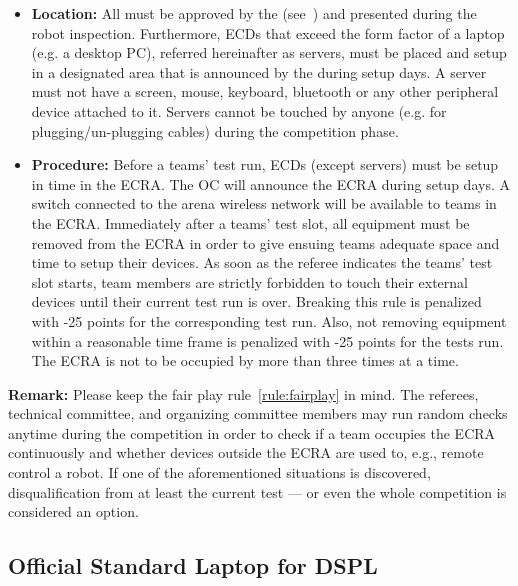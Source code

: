 \begin{itemize}
  \item \textbf{Location:} All  must be approved by the 
  		(see~) and presented during the robot inspection. Furthermore, ECDs
  		that exceed the form factor of a laptop (e.g. a desktop PC), referred hereinafter as servers, must be placed and
  		setup in a designated area that is announced by the  during setup days.
  		A server must not have a screen, mouse, keyboard, bluetooth or any other peripheral device attached to it.
  		Servers cannot be touched by anyone (e.g. for plugging/un-plugging cables) during the competition phase.
  \item \textbf{Procedure:} Before a teams' test run, ECDs (except servers) must be setup in time in the
		 {ECRA}. The OC will announce the
        ECRA during setup days. A switch connected to the arena wireless network will be available to teams in the ECRA.
  		Immediately after a teams' test slot, all equipment must be removed from the ECRA in order to give ensuing
        teams adequate space and time to setup their devices. As soon as the referee indicates the teams' test slot
        starts, team members are strictly forbidden to touch their external devices until their current test run is over.
        Breaking this  rule is penalized with -25 points for the corresponding test run. Also, not removing
        equipment within a reasonable time frame is penalized with -25 points for the tests run. The ECRA is not to be
		occupied by more than three times at a time.
\end{itemize}

\textbf{Remark:} Please keep the fair play rule~\ref{rule:fairplay} in mind. The referees, technical committee,
        and organizing committee members may run random checks anytime during the competition in order to check if a team
        occupies the ECRA continuously and whether devices outside the ECRA are used to, e.g., remote control a robot.
        If one of the aforementioned situations is discovered, disqualification from at least the current test --- or
        even the whole competition is considered an option.


\subsection{Official Standard Laptop for DSPL}
\label{rule:osl_dspl}
% 
% 

